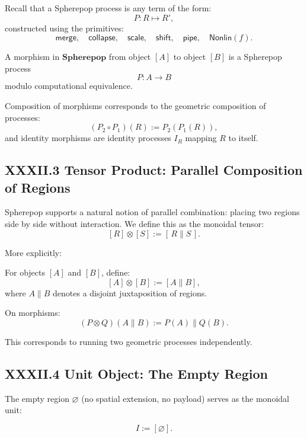 \documentclass[11pt,letterpaper]{article}
\begin{document}
Recall that a Spherepop process is any term of the form:
\[
P : R \mapsto R',
\]
constructed using the primitives:
\[
\mathsf{merge},\quad \mathsf{collapse},\quad \mathsf{scale},\quad \mathsf{shift},\quad \mathsf{pipe},\quad \mathsf{Nonlin}(f).
\]

\begin{definition}[Morphisms]
A morphism in $\mathbf{Spherepop}$ from object $[A]$ to object $[B]$ is a Spherepop process 
\[
P : A \to B
\]
modulo computational equivalence.
\end{definition}

Composition of morphisms corresponds to the geometric composition of processes:
\[
(P_2 \circ P_1)(R) := P_2(P_1(R)),
\]
and identity morphisms are identity processes $I_R$ mapping $R$ to itself.

\subsection{XXXII.3 Tensor Product: Parallel Composition of Regions}

Spherepop supports a natural notion of parallel combination: placing two regions side by side without interaction. We define this as the monoidal tensor:
\[
[R] \otimes [S] := [\,R \parallel S\,].
\]

More explicitly:

\begin{definition}
For objects $[A]$ and $[B]$, define:
\[
[A] \otimes [B] := [A \parallel B],
\]
where $A \parallel B$ denotes a disjoint juxtaposition of regions.
\end{definition}

On morphisms:
\[
(P \otimes Q)(A \parallel B) := P(A) \parallel Q(B).
\]

This corresponds to running two geometric processes independently.

\subsection{XXXII.4 Unit Object: The Empty Region}

The empty region $\varnothing$ (no spatial extension, no payload) serves as the monoidal unit:

\[
I := [\varnothing].
\]
\end{document}
